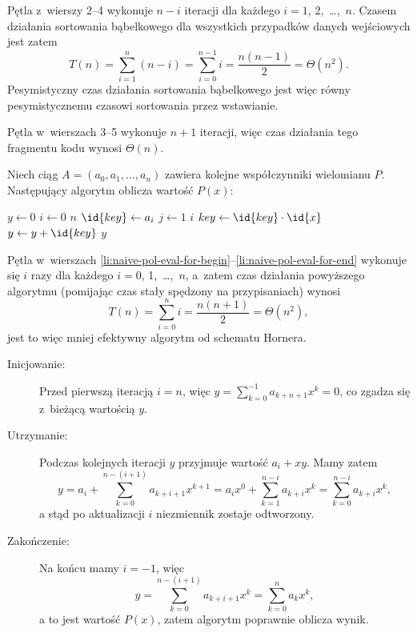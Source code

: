\subexercise{} %
Pętla  z~wierszy 2\nobreakdash--4 wykonuje $n-i$ iteracji dla każdego $i=1$, 2,~\dots,~$n$. Czasem działania sortowania bąbelkowego dla wszystkich przypadków danych wejściowych jest zatem
\[
	T(n) = \sum_{i=1}^n(n-i) = \sum_{i=0}^{n-1}i = \frac{n(n-1)}{2} = \Theta(n^2).
\]
Pesymistyczny czas działania sortowania bąbelkowego jest więc równy pesymistycznemu czasowi sortowania przez wstawianie.


\subexercise{} %
Pętla  w~wierszach 3\nobreakdash--5 wykonuje $n+1$ iteracji, więc czas działania tego fragmentu kodu wynosi $\Theta(n)$.

\subexercise{} %
Niech ciąg $A=(a_0,a_1,\dots,a_n)$ zawiera kolejne współczynniki wielomianu $P$. Następujący algorytm oblicza wartość $P(x)$:
\begin{codebox}
\li	$y\gets0$
\li	\For $i\gets0$ \To $n$
\li		\Do
			$\id{key}\gets a_i$
\li			\For $j\gets1$ \To $i$ \label{li:naive-pol-eval-for-begin}
\li				\Do
					$key\gets\id{key}\cdot\id{x}$
				\End \label{li:naive-pol-eval-for-end}
\li			$y\gets y+\id{key}$
		\End
\li	\Return $y$
\end{codebox}
Pętla  w~wierszach \ref{li:naive-pol-eval-for-begin}\nobreakdash--\ref{li:naive-pol-eval-for-end} wykonuje się $i$ razy dla każdego $i=0$, 1,~\dots,~$n$, a~zatem czas działania powyższego algorytmu (pomijając czas stały spędzony na przypisaniach) wynosi
\[
	T(n) = \sum_{i=0}^ni = \frac{n(n+1)}{2} = \Theta(n^2),
\]
jest to więc mniej efektywny algorytm od schematu Hornera.

\subexercise{} %
\begin{description}
	\item[Inicjowanie:] Przed pierwszą iteracją $i=n$, więc $y=\sum_{k=0}^{-1}a_{k+n+1}x^k=0$, co zgadza się z~bieżącą wartością $y$.
	\item[Utrzymanie:] Podczas kolejnych iteracji $y$ przyjmuje wartość $a_i+xy$. Mamy zatem
	\[
		y = a_i+\sum_{k=0}^{n-(i+1)}a_{k+i+1}x^{k+1} = a_ix^0+\sum_{k=1}^{n-i}a_{k+i}x^k = \sum_{k=0}^{n-i}a_{k+i}x^k,
	\]
	a stąd po aktualizacji $i$ niezmiennik zostaje odtworzony.
	\item[Zakończenie:] Na końcu mamy $i=-1$, więc
	\[
		y = \sum_{k=0}^{n-(i+1)}a_{k+i+1}x^k = \sum_{k=0}^na_kx^k,
	\]
	a to jest wartość $P(x)$, zatem algorytm poprawnie oblicza wynik.
\end{description}

